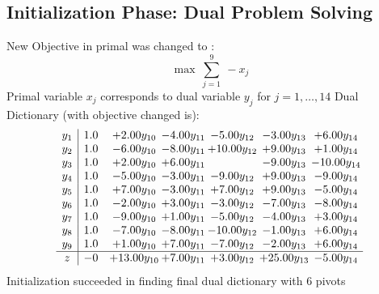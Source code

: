 \documentclass[9pt]{article}
\begin{document}
\subsection{Initialization Phase: Dual Problem Solving}
New Objective in primal was changed to : \[ \max\ \sum_{j=1}^{9}\ - x_j \] 
Primal variable $x_j$ corresponds to dual variable $y_j$ for $j = 1,\ldots,14$
Dual Dictionary (with objective changed is): 
\[\begin{array}{c| c c@{\hskip 2pt} c@{\hskip 2pt} c@{\hskip 2pt} c@{\hskip 2pt} c@{\hskip 2pt} }
 y_{1}   &  1.0 & +  2.00 y_{10} & -4.00 y_{11} & -5.00 y_{12} & -3.00 y_{13} & +  6.00 y_{14}\\
 y_{2}   &  1.0 & -6.00 y_{10} & -8.00 y_{11} & + 10.00 y_{12} & +  9.00 y_{13} & +  1.00 y_{14}\\
 y_{3}   &  1.0 & +  2.00 y_{10} & +  6.00 y_{11} &   & -9.00 y_{13} & -10.00 y_{14}\\
 y_{4}   &  1.0 & -5.00 y_{10} & -3.00 y_{11} & -9.00 y_{12} & +  9.00 y_{13} & -9.00 y_{14}\\
 y_{5}   &  1.0 & +  7.00 y_{10} & -3.00 y_{11} & +  7.00 y_{12} & +  9.00 y_{13} & -5.00 y_{14}\\
 y_{6}   &  1.0 & -2.00 y_{10} & +  3.00 y_{11} & -3.00 y_{12} & -7.00 y_{13} & -8.00 y_{14}\\
 y_{7}   &  1.0 & -9.00 y_{10} & +  1.00 y_{11} & -5.00 y_{12} & -4.00 y_{13} & +  3.00 y_{14}\\
 y_{8}   &  1.0 & -7.00 y_{10} & -8.00 y_{11} & -10.00 y_{12} & -1.00 y_{13} & +  6.00 y_{14}\\
 y_{9}   &  1.0 & +  1.00 y_{10} & +  7.00 y_{11} & -7.00 y_{12} & -2.00 y_{13} & +  6.00 y_{14}\\
\hline
z    &  -0 & + 13.00 y_{10} & +  7.00 y_{11} & +  3.00 y_{12} & + 25.00 y_{13} & -5.00 y_{14}\\
\end{array}\]
Initialization succeeded in finding final dual dictionary with 6 pivots
\end{document}
